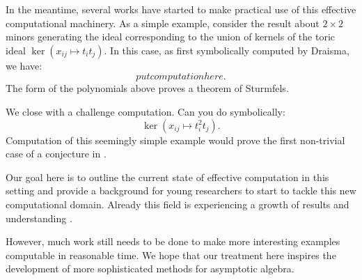 In the meantime, several works have started to make practical use of this effective computational machinery.  As a simple example, consider the result about $2 \times 2$ minors generating the ideal corresponding to the union of kernels of the toric ideal $\ker{(x_{ij} \mapsto t_i t_j)}$.  In this case, as first symbolically computed by Draisma, we have:
\[ put computation here.\]
The form of the polynomials above proves a theorem of Sturmfels.

We close with a challenge computation.  Can you do symbolically:
\[ \ker{(x_{ij} \mapsto t_i^2 t_j)}.\]
Computation of this seemingly simple example would prove the first non-trivial case of a conjecture in \cite{aschenbrenner2007finite}.

Our goal here is to outline the current state of effective computation in this setting and provide a background for young researchers to start to tackle this new computational domain.  Already this field is experiencing a growth of results and understanding \cite{Nagel, krone2016hilbert}.

However, much work still needs to be done to make more interesting examples computable in reasonable time.  We hope that our treatment here inspires the development of more sophisticated methods for asymptotic algebra.


\cite{kemer2008analog}



